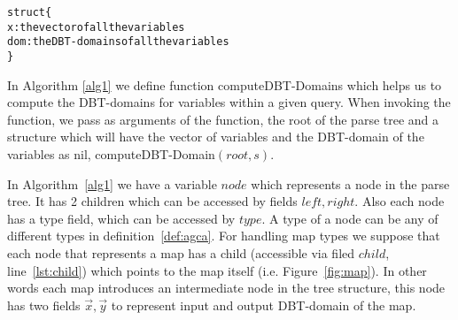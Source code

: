 \documentclass[12pt]{article}
\begin{document}
\begin{program}
\begin{alltt}
struct \{
x: the vector of all the variables 
dom: the DBT-domains of all the variables
\}
\end{alltt}
\caption{$NodeAttribute$}
\label{struct}
\end{program}
In Algorithm \ref{alg1} we define function \textsf{computeDBT-Domains} which helps us to compute the DBT-domains for variables within a given query. When invoking the function, we pass as arguments of the function, the root of the parse tree and a structure which will have the vector of variables and the DBT-domain of the variables as nil, \textsf{computeDBT-Domain}$(root,s)$.
\par
In Algorithm~\ref{alg1} we have a variable $node$ which represents a node in the parse tree. It has 2 children which can be accessed by fields $left, right$. Also each node has a type field, which can be accessed by $type$. A type of a node can be any of different types in definition~\eqref{def:agca}. For handling map types we suppose that each node that represents a map has a child (accessible via filed $child$, line~\ref{lst:child}) which points to the map itself (i.e. Figure~\ref{fig:map}). In other words each map introduces an intermediate node in the tree structure, this node has two fields $\vec{x},\vec{y}$ to represent input and output DBT-domain of the map. 
\end{document}

